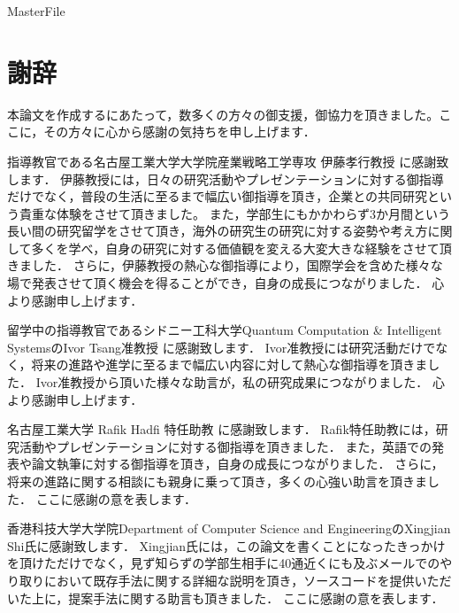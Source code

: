 \expandafter\ifx\csname MasterFile\endcsname\relax
\def\SubFile{hoge}


\fi
\cleardoublepage
\chapter*{謝辞}

本論文を作成するにあたって，数多くの方々の御支援，御協力を頂きました。ここに，その方々に心から感謝の気持ちを申し上げます． \par
\vspace{0.5cm}

指導教官である名古屋工業大学大学院産業戦略工学専攻 伊藤孝行教授 に感謝致します．
伊藤教授には，日々の研究活動やプレゼンテーションに対する御指導だけでなく，普段の生活に至るまで幅広い御指導を頂き，企業との共同研究という貴重な体験をさせて頂きました。
また，学部生にもかかわらず3か月間という長い間の研究留学をさせて頂き，海外の研究生の研究に対する姿勢や考え方に関して多くを学べ，自身の研究に対する価値観を変える大変大きな経験をさせて頂きました．
さらに，伊藤教授の熱心な御指導により，国際学会を含めた様々な場で発表させて頂く機会を得ることができ，自身の成長につながりました．
心より感謝申し上げます． \par
\vspace{0.5cm}

留学中の指導教官であるシドニー工科大学Quantum Computation \& Intelligent SystemsのIvor Tsang准教授 に感謝致します．
Ivor准教授には研究活動だけでなく，将来の進路や進学に至るまで幅広い内容に対して熱心な御指導を頂きました．
Ivor准教授から頂いた様々な助言が，私の研究成果につながりました．
心より感謝申し上げます． \par
\vspace{0.5cm}

名古屋工業大学 Rafik Hadfi 特任助教 に感謝致します．
Rafik特任助教には，研究活動やプレゼンテーションに対する御指導を頂きました．
また，英語での発表や論文執筆に対する御指導を頂き，自身の成長につながりました．
さらに，将来の進路に関する相談にも親身に乗って頂き，多くの心強い助言を頂きました．
ここに感謝の意を表します． \par
\vspace{0.5cm}

香港科技大学大学院Department of Computer Science and EngineeringのXingjian Shi氏に感謝致します．
Xingjian氏には，この論文を書くことになったきっかけを頂けただけでなく，見ず知らずの学部生相手に40通近くにも及ぶメールでのやり取りにおいて既存手法に関する詳細な説明を頂き，ソースコードを提供いただいた上に，提案手法に関する助言も頂きました．
ここに感謝の意を表します． \par
\vspace{0.5cm}

